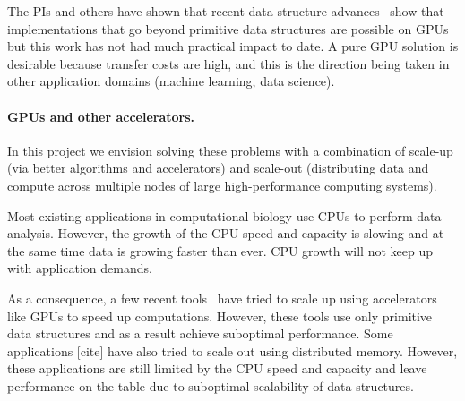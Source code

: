 The PIs and others have shown that recent data structure advances~\cite{cite-somethin} show that
implementations that go beyond primitive data structures are possible on GPUs
but this work has not had much practical impact to date.      A pure GPU solution is
desirable because transfer costs are high, and this is the direction being taken
in other application domains (machine learning, data science).

\paragraph{GPUs and other accelerators.}

In this project we envision solving these problems with a combination of  scale-up (via better algorithms and accelerators) and scale-out (distributing data and compute across multiple nodes of large high-performance computing systems). 


Most existing applications in computational biology use CPUs to perform data  analysis.
However, the growth of the CPU speed and capacity is slowing and at the same time data is growing faster than ever. CPU growth will not keep up with application demands.

As a consequence, a few recent tools~\cite{cite-something} have tried to scale
up using accelerators like GPUs to speed up computations. However, these tools
use only primitive data structures and as a result achieve suboptimal
performance. Some applications [cite] have also tried to scale out using
distributed memory.  However, these applications are still limited by the CPU
speed and capacity and leave performance on the table due to suboptimal
scalability of data structures.




